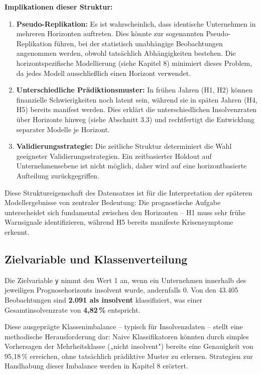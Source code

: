 \textbf{Implikationen dieser Struktur:}

\begin{enumerate}[topsep=0.3\baselineskip]
    \item \textbf{Pseudo-Replikation:} Es ist wahrscheinlich, dass identische Unternehmen in mehreren Horizonten auftreten. Dies könnte zur sogenannten Pseudo-Replikation führen, bei der statistisch unabhängige Beobachtungen angenommen werden, obwohl tatsächlich Abhängigkeiten bestehen. Die horizontspezifische Modellierung (siehe Kapitel 8) minimiert dieses Problem, da jedes Modell ausschließlich einen Horizont verwendet.
    
    \item \textbf{Unterschiedliche Prädiktionsmuster:} In frühen Jahren (H1, H2) können finanzielle Schwierigkeiten noch latent sein, während sie in späten Jahren (H4, H5) bereits manifest werden. Dies erklärt die unterschiedlichen Insolvenzraten über Horizonte hinweg (siehe Abschnitt 3.3) und rechtfertigt die Entwicklung separater Modelle je Horizont.
    
    \item \textbf{Validierungsstrategie:} Die zeitliche Struktur determiniert die Wahl geeigneter Validierungsstrategien. Ein zeitbasierter Holdout auf Unternehmensebene ist nicht möglich, daher wird auf eine horizontbasierte Aufteilung zurückgegriffen.
\end{enumerate}

Diese Struktureigenschaft des Datensatzes ist für die Interpretation der späteren Modellergebnisse von zentraler Bedeutung: Die prognostische Aufgabe unterscheidet sich fundamental zwischen den Horizonten -- H1 muss sehr frühe Warnsignale identifizieren, während H5 bereits manifeste Krisensymptome erkennt.

\subsection{Zielvariable und Klassenverteilung}

Die Zielvariable \texttt{y} nimmt den Wert 1 an, wenn ein Unternehmen innerhalb des jeweiligen Prognosehorizonts insolvent wurde, andernfalls 0. Von den 43.405 Beobachtungen sind \textbf{2.091 als insolvent} klassifiziert, was einer Gesamtinsolvenzrate von \textbf{4,82\,\%} entspricht.

Diese ausgeprägte Klassenimbalance – typisch für Insolvenzdaten – stellt eine methodische Herausforderung dar: Naive Klassifikatoren könnten durch simples Vorhersagen der Mehrheitsklasse („nicht insolvent") bereits eine Genauigkeit von 95,18\,\% erreichen, ohne tatsächlich prädiktive Muster zu erlernen. Strategien zur Handhabung dieser Imbalance werden in Kapitel 8 erörtert.

